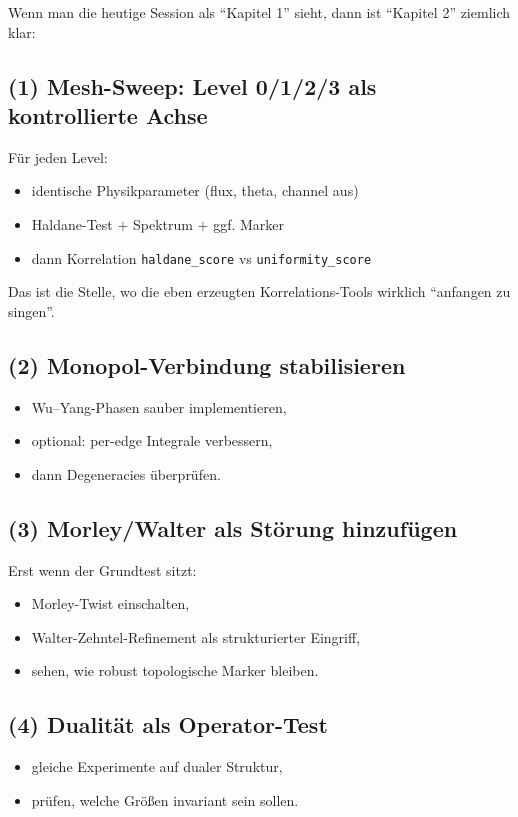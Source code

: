\documentclass[11pt,a4paper]{article}
\begin{document}
Wenn man die heutige Session als ``Kapitel 1'' sieht, dann ist ``Kapitel 2'' ziemlich klar:

\subsection{(1) Mesh-Sweep: Level 0/1/2/3 als kontrollierte Achse}

Für jeden Level:
\begin{itemize}[leftmargin=*,itemsep=0.5em]
    \item identische Physikparameter (flux, theta, channel aus)
    \item Haldane-Test + Spektrum + ggf. Marker
    \item dann Korrelation \texttt{haldane\_score} vs \texttt{uniformity\_score}
\end{itemize}

Das ist die Stelle, wo die eben erzeugten Korrelations-Tools wirklich ``anfangen zu singen''.

\subsection{(2) Monopol-Verbindung stabilisieren}
\begin{itemize}[leftmargin=*,itemsep=0.5em]
    \item Wu--Yang-Phasen sauber implementieren,
    \item optional: per-edge Integrale verbessern,
    \item dann Degeneracies überprüfen.
\end{itemize}

\subsection{(3) Morley/Walter als Störung hinzufügen}

Erst wenn der Grundtest sitzt:
\begin{itemize}[leftmargin=*,itemsep=0.5em]
    \item Morley-Twist einschalten,
    \item Walter-Zehntel-Refinement als strukturierter Eingriff,
    \item sehen, wie robust topologische Marker bleiben.
\end{itemize}

\subsection{(4) Dualität als Operator-Test}
\begin{itemize}[leftmargin=*,itemsep=0.5em]
    \item gleiche Experimente auf dualer Struktur,
    \item prüfen, welche Größen invariant sein sollen.
\end{itemize}
\end{document}
